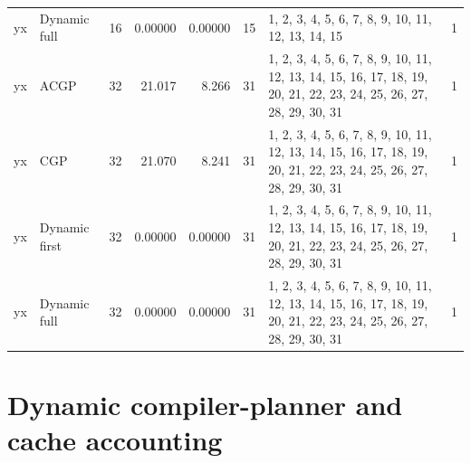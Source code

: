 \documentclass[10pt,a4paper]{article}
\begin{document}
\begin{longtable}{@{}p{23mm}p{29mm}rrrrp{36mm}r@{}}
yx & Dynamic full & 16 & 0.00000 & 0.00000 & 15 & 1, 2, 3, 4, 5, 6, 7, 8, 9, 10, 11, 12, 13, 14, 15 & 1 \\
yx & ACGP & 32 & 21.017 & 8.266 & 31 & 1, 2, 3, 4, 5, 6, 7, 8, 9, 10, 11, 12, 13, 14, 15, 16, 17, 18, 19, 20, 21, 22, 23, 24, 25, 26, 27, 28, 29, 30, 31 & 1 \\
yx & CGP & 32 & 21.070 & 8.241 & 31 & 1, 2, 3, 4, 5, 6, 7, 8, 9, 10, 11, 12, 13, 14, 15, 16, 17, 18, 19, 20, 21, 22, 23, 24, 25, 26, 27, 28, 29, 30, 31 & 1 \\
yx & Dynamic first & 32 & 0.00000 & 0.00000 & 31 & 1, 2, 3, 4, 5, 6, 7, 8, 9, 10, 11, 12, 13, 14, 15, 16, 17, 18, 19, 20, 21, 22, 23, 24, 25, 26, 27, 28, 29, 30, 31 & 1 \\
yx & Dynamic full & 32 & 0.00000 & 0.00000 & 31 & 1, 2, 3, 4, 5, 6, 7, 8, 9, 10, 11, 12, 13, 14, 15, 16, 17, 18, 19, 20, 21, 22, 23, 24, 25, 26, 27, 28, 29, 30, 31 & 1 \\
\end{longtable}\normalsize\setlength{\tabcolsep}{6pt}
\clearpage
\section*{Dynamic compiler-planner and cache accounting}
\clearpage
\end{document}
